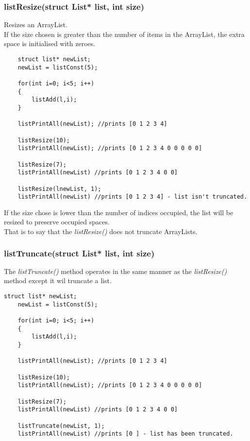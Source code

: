 \documentclass{article}
\begin{document}
\subsubsection*{listResize(struct List* list, int size)}
Resizes an ArrayList.\\
If the size chosen is greater than the number of items in the ArrayList, the extra space is initialised with zeroes.\\

\begin{lstlisting}
    struct list* newList;
    newList = listConst(5);
    
    for(int i=0; i<5; i++)
    {
        listAdd(l,i);
    }
    
    listPrintAll(newList); //prints [0 1 2 3 4]

    listResize(10);
    listPrintAll(newList); //prints [0 1 2 3 4 0 0 0 0 0]

    listResize(7);
    listPrintAll(newList) //prints [0 1 2 3 4 0 0]

    listResize(lnewList, 1);
    listPrintAll(newList) //prints [0 1 2 3 4] - list isn't truncated.

\end{lstlisting}
If the size chose is lower than the number of indices occupied, the list will be resized to preserve occupied spaces.\\
That is to say that the \emph{listResize()} does not truncate ArrayLists.
\newpage
\subsubsection*{listTruncate(struct List* list, int size)}
The \emph{listTruncate()} method operates in the same manner as the \emph{listResize()} method except it wil truncate a list.
\begin{lstlisting}
struct list* newList;
    newList = listConst(5);
    
    for(int i=0; i<5; i++)
    {
        listAdd(l,i);
    }
    
    listPrintAll(newList); //prints [0 1 2 3 4]

    listResize(10);
    listPrintAll(newList); //prints [0 1 2 3 4 0 0 0 0 0]

    listResize(7);
    listPrintAll(newList) //prints [0 1 2 3 4 0 0]

    listTruncate(newList, 1);
    listPrintAll(newList) //prints [0 ] - list has been truncated.
\end{lstlisting}
\end{document}
